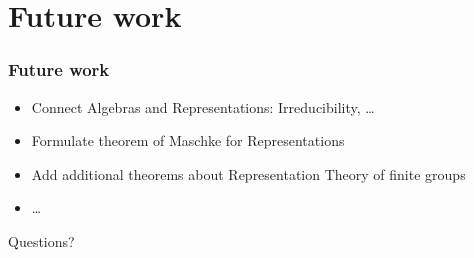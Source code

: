 \documentclass{beamer}
\begin{document}
\section{Future work}
\begin{frame}
\frametitle{Future work}
\begin{itemize}
\pause
\item Connect Algebras and Representations: Irreducibility, \ldots
\pause
\item Formulate theorem of Maschke for Representations
\pause
\item Add additional theorems about Representation Theory of finite groups
\item \ldots
\end{itemize}
\end{frame}


\begin{frame}
\begin{center}
\huge Questions?
\end{center}
\end{frame}
\end{document}
